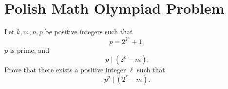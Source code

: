 \section{Polish Math Olympiad Problem}

\begin{theorem}
Let $k, m, n, p$ be positive integers such that
\[
p = 2^{2^n} + 1,
\]
$p$ is prime, and
\[
p \mid (2^k - m).
\]
Prove that there exists a positive integer $\ell$ such that
\[
p^2 \mid (2^\ell - m).
\]
\end{theorem}
